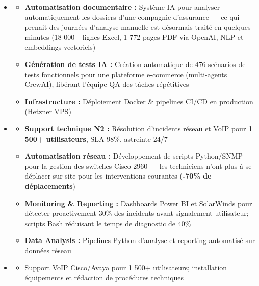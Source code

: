 \documentclass[11pt,a4paper]{article}
\renewcommand{\itemspace}{\vspace{0.2em}}
\begin{document}
\begin{itemize}[leftmargin=1em, label={}]
    \item
    \begin{itemize}[leftmargin=1.5em, label={$\circ$}, nosep]
        \item \textbf{Automatisation documentaire :} Système IA pour analyser automatiquement les dossiers d'une compagnie d'assurance — ce qui prenait des journées d'analyse manuelle est désormais traité en quelques minutes (18 000+ lignes Excel, 1 772 pages PDF via OpenAI, NLP et embeddings vectoriels)
        \item \textbf{Génération de tests IA :} Création automatique de 476 scénarios de tests fonctionnels pour une plateforme e-commerce (multi-agents CrewAI), libérant l'équipe QA des tâches répétitives
        \item \textbf{Infrastructure :} Déploiement Docker \& pipelines CI/CD en production (Hetzner VPS)
    \end{itemize}

    \itemspace
    \item
    \begin{itemize}[leftmargin=1.5em, label={$\circ$}, nosep]
        \item \textbf{Support technique N2 :} Résolution d'incidents réseau et VoIP pour \textbf{1 500+ utilisateurs}, SLA 98\%, astreinte 24/7
        \item \textbf{Automatisation réseau :} Développement de scripts Python/SNMP pour la gestion des switches Cisco 2960 — les techniciens n'ont plus à se déplacer sur site pour les interventions courantes (\textbf{-70\% de déplacements})
        \item \textbf{Monitoring \& Reporting :} Dashboards Power BI et SolarWinds pour détecter proactivement 30\% des incidents avant signalement utilisateur; scripts Bash réduisant le temps de diagnostic de 40\%
        \item \textbf{Data Analysis :} Pipelines Python d'analyse et reporting automatisé sur données réseau
    \end{itemize}

    \itemspace
    \item
    \begin{itemize}[leftmargin=1.5em, label={$\circ$}, nosep]
        \item Support VoIP Cisco/Avaya pour 1 500+ utilisateurs; installation équipements et rédaction de procédures techniques
    \end{itemize}


\end{itemize}
\end{document}
